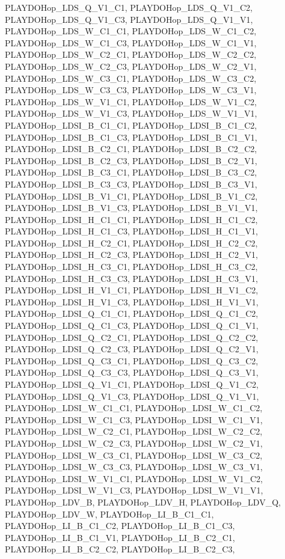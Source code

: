 PLAYDOHop\_\-LDS\_\-Q\_\-V1\_\-C1, PLAYDOHop\_\-LDS\_\-Q\_\-V1\_\-C2, PLAYDOHop\_\-LDS\_\-Q\_\-V1\_\-C3, PLAYDOHop\_\-LDS\_\-Q\_\-V1\_\-V1, PLAYDOHop\_\-LDS\_\-W\_\-C1\_\-C1, PLAYDOHop\_\-LDS\_\-W\_\-C1\_\-C2, PLAYDOHop\_\-LDS\_\-W\_\-C1\_\-C3, PLAYDOHop\_\-LDS\_\-W\_\-C1\_\-V1, PLAYDOHop\_\-LDS\_\-W\_\-C2\_\-C1, PLAYDOHop\_\-LDS\_\-W\_\-C2\_\-C2, PLAYDOHop\_\-LDS\_\-W\_\-C2\_\-C3, PLAYDOHop\_\-LDS\_\-W\_\-C2\_\-V1, PLAYDOHop\_\-LDS\_\-W\_\-C3\_\-C1, PLAYDOHop\_\-LDS\_\-W\_\-C3\_\-C2, PLAYDOHop\_\-LDS\_\-W\_\-C3\_\-C3, PLAYDOHop\_\-LDS\_\-W\_\-C3\_\-V1, PLAYDOHop\_\-LDS\_\-W\_\-V1\_\-C1, PLAYDOHop\_\-LDS\_\-W\_\-V1\_\-C2, PLAYDOHop\_\-LDS\_\-W\_\-V1\_\-C3, PLAYDOHop\_\-LDS\_\-W\_\-V1\_\-V1, PLAYDOHop\_\-LDSI\_\-B\_\-C1\_\-C1, PLAYDOHop\_\-LDSI\_\-B\_\-C1\_\-C2, PLAYDOHop\_\-LDSI\_\-B\_\-C1\_\-C3, PLAYDOHop\_\-LDSI\_\-B\_\-C1\_\-V1, PLAYDOHop\_\-LDSI\_\-B\_\-C2\_\-C1, PLAYDOHop\_\-LDSI\_\-B\_\-C2\_\-C2, PLAYDOHop\_\-LDSI\_\-B\_\-C2\_\-C3, PLAYDOHop\_\-LDSI\_\-B\_\-C2\_\-V1, PLAYDOHop\_\-LDSI\_\-B\_\-C3\_\-C1, PLAYDOHop\_\-LDSI\_\-B\_\-C3\_\-C2, PLAYDOHop\_\-LDSI\_\-B\_\-C3\_\-C3, PLAYDOHop\_\-LDSI\_\-B\_\-C3\_\-V1, PLAYDOHop\_\-LDSI\_\-B\_\-V1\_\-C1, PLAYDOHop\_\-LDSI\_\-B\_\-V1\_\-C2, PLAYDOHop\_\-LDSI\_\-B\_\-V1\_\-C3, PLAYDOHop\_\-LDSI\_\-B\_\-V1\_\-V1, PLAYDOHop\_\-LDSI\_\-H\_\-C1\_\-C1, PLAYDOHop\_\-LDSI\_\-H\_\-C1\_\-C2, PLAYDOHop\_\-LDSI\_\-H\_\-C1\_\-C3, PLAYDOHop\_\-LDSI\_\-H\_\-C1\_\-V1, PLAYDOHop\_\-LDSI\_\-H\_\-C2\_\-C1, PLAYDOHop\_\-LDSI\_\-H\_\-C2\_\-C2, PLAYDOHop\_\-LDSI\_\-H\_\-C2\_\-C3, PLAYDOHop\_\-LDSI\_\-H\_\-C2\_\-V1, PLAYDOHop\_\-LDSI\_\-H\_\-C3\_\-C1, PLAYDOHop\_\-LDSI\_\-H\_\-C3\_\-C2, PLAYDOHop\_\-LDSI\_\-H\_\-C3\_\-C3, PLAYDOHop\_\-LDSI\_\-H\_\-C3\_\-V1, PLAYDOHop\_\-LDSI\_\-H\_\-V1\_\-C1, PLAYDOHop\_\-LDSI\_\-H\_\-V1\_\-C2, PLAYDOHop\_\-LDSI\_\-H\_\-V1\_\-C3, PLAYDOHop\_\-LDSI\_\-H\_\-V1\_\-V1, PLAYDOHop\_\-LDSI\_\-Q\_\-C1\_\-C1, PLAYDOHop\_\-LDSI\_\-Q\_\-C1\_\-C2, PLAYDOHop\_\-LDSI\_\-Q\_\-C1\_\-C3, PLAYDOHop\_\-LDSI\_\-Q\_\-C1\_\-V1, PLAYDOHop\_\-LDSI\_\-Q\_\-C2\_\-C1, PLAYDOHop\_\-LDSI\_\-Q\_\-C2\_\-C2, PLAYDOHop\_\-LDSI\_\-Q\_\-C2\_\-C3, PLAYDOHop\_\-LDSI\_\-Q\_\-C2\_\-V1, PLAYDOHop\_\-LDSI\_\-Q\_\-C3\_\-C1, PLAYDOHop\_\-LDSI\_\-Q\_\-C3\_\-C2, PLAYDOHop\_\-LDSI\_\-Q\_\-C3\_\-C3, PLAYDOHop\_\-LDSI\_\-Q\_\-C3\_\-V1, PLAYDOHop\_\-LDSI\_\-Q\_\-V1\_\-C1, PLAYDOHop\_\-LDSI\_\-Q\_\-V1\_\-C2, PLAYDOHop\_\-LDSI\_\-Q\_\-V1\_\-C3, PLAYDOHop\_\-LDSI\_\-Q\_\-V1\_\-V1, PLAYDOHop\_\-LDSI\_\-W\_\-C1\_\-C1, PLAYDOHop\_\-LDSI\_\-W\_\-C1\_\-C2, PLAYDOHop\_\-LDSI\_\-W\_\-C1\_\-C3, PLAYDOHop\_\-LDSI\_\-W\_\-C1\_\-V1, PLAYDOHop\_\-LDSI\_\-W\_\-C2\_\-C1, PLAYDOHop\_\-LDSI\_\-W\_\-C2\_\-C2, PLAYDOHop\_\-LDSI\_\-W\_\-C2\_\-C3, PLAYDOHop\_\-LDSI\_\-W\_\-C2\_\-V1, PLAYDOHop\_\-LDSI\_\-W\_\-C3\_\-C1, PLAYDOHop\_\-LDSI\_\-W\_\-C3\_\-C2, PLAYDOHop\_\-LDSI\_\-W\_\-C3\_\-C3, PLAYDOHop\_\-LDSI\_\-W\_\-C3\_\-V1, PLAYDOHop\_\-LDSI\_\-W\_\-V1\_\-C1, PLAYDOHop\_\-LDSI\_\-W\_\-V1\_\-C2, PLAYDOHop\_\-LDSI\_\-W\_\-V1\_\-C3, PLAYDOHop\_\-LDSI\_\-W\_\-V1\_\-V1, PLAYDOHop\_\-LDV\_\-B, PLAYDOHop\_\-LDV\_\-H, PLAYDOHop\_\-LDV\_\-Q, PLAYDOHop\_\-LDV\_\-W, PLAYDOHop\_\-LI\_\-B\_\-C1\_\-C1, PLAYDOHop\_\-LI\_\-B\_\-C1\_\-C2, PLAYDOHop\_\-LI\_\-B\_\-C1\_\-C3, PLAYDOHop\_\-LI\_\-B\_\-C1\_\-V1, PLAYDOHop\_\-LI\_\-B\_\-C2\_\-C1, PLAYDOHop\_\-LI\_\-B\_\-C2\_\-C2, PLAYDOHop\_\-LI\_\-B\_\-C2\_\-C3, 